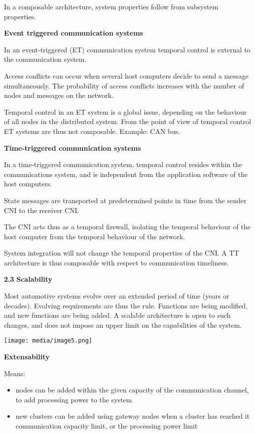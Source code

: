 In a composable architecture, system properties follow from subsystem
properties.

\textbf{Event triggered communication systems}

In an event-triggered (ET) communication system temporal control is
external to the communication system.

Access conflicts can occur when several host computers decide to send a
message simultaneously. The probability of access conflicts increases
with the number of nodes and messages on the network.

Temporal control in an ET system is a global issue, depending on the
behaviour of all nodes in the distributed system. From the point of view
of temporal control ET systems are thus not composable. Example: CAN
bus.

\textbf{Time-triggered communication systems}

In a time-triggered communication system, temporal control resides
within the communications system, and is independent from the
application software of the host computers.

State messages are transported at predetermined points in time from the
sender CNI to the receiver CNI.

The CNI acts thus as a temporal firewall, isolating the temporal
behaviour of the host computer from the temporal behaviour of the
network.

System integration will not change the temporal properties of the CNI. A
TT architecture is thus composable with respect to communication
timeliness.

\textbf{2.3} \protect\hypertarget{teil4}{}{}\textbf{Scalability}

Most automotive systems evolve over an extended period of time (years or
decades). Evolving requirements are thus the rule. Functions are being
modified, and new functions are being added. A scalable architecture is
open to such changes, and does not impose an upper limit on the
capabilities of the system.

\texttt{[image: media/image5.png]}

\textbf{Extensability}

Means:

\begin{itemize}
\item
  nodes can be added within the given capacity of the communication
  channel, to add processing power to the system
\item
  new clusters can be added using gateway nodes when a cluster has
  reached it communication capacity limit, or the processing power limit
\end{itemize}

